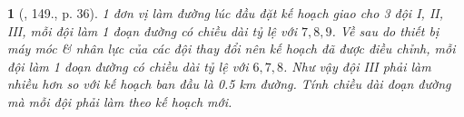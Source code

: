 \documentclass{article}
\newtheorem{baitoan}{}
\begin{document}
\begin{baitoan}[\cite{Tuyen_Toan_7}, 149., p. 36]
	1 đơn vị làm đường lúc đầu đặt kế hoạch giao cho 3 đội I, II, III, mỗi đội làm 1 đoạn đường có chiều dài tỷ lệ với $7,8,9$. Về sau do thiết bị máy móc \& nhân lực của các đội thay đổi nên kế hoạch đã được điều chỉnh, mỗi đội làm 1 đoạn đường có chiều dài tỷ lệ với $6,7,8$. Như vậy đội III phải làm nhiều hơn so với kế hoạch ban đầu là {\rm0.5 km} đường. Tính chiều dài đoạn đường mà mỗi đội phải làm theo kế hoạch mới.
\end{baitoan}


\printbibliography[heading=bibintoc]
	
\end{document}
